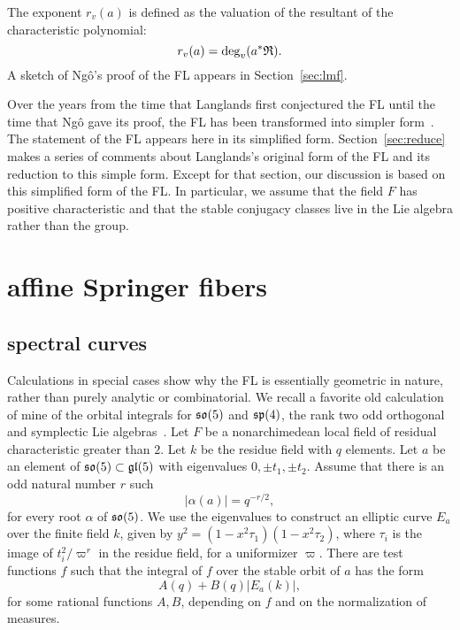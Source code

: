 \documentclass[brochure,english,12pt]{bourbaki}
\def\so{\frak{so}}
\def\sp{\frak{sp}}
\def\gl{\frak{gl}}
\def\RDIV{{\frak{R}}}
\begin{document}
The  exponent $r_v(a)$ is defined as the valuation of the resultant of the characteristic polynomial:
\[
r_v(a) = \deg_v(a^*\RDIV).
\]
A sketch of Ng\^o's proof of the FL  appears in Section~\ref{sec:lmf}. 


Over the years from the time that Langlands first conjectured the FL
until the time that Ng\^o gave its proof, the FL has been transformed
into simpler form~\cite{Langlands:debuts}.  The statement of the FL appears here in its
simplified form.  Section~\ref{sec:reduce} makes a series of comments
about Langlands's original form of the FL and its reduction
to this simple form.  Except for that section, our discussion is based
on this simplified form of the FL.  In particular, we assume that the
field $F$ has positive characteristic and that the stable conjugacy
classes live in the Lie algebra rather than the group.


\section{affine Springer fibers}

\subsection{spectral curves}

Calculations in special cases show why the FL is
essentially geometric in nature, rather than purely analytic or
combinatorial. We recall a favorite old calculation of mine of the
orbital integrals for $\so(5)$ and $\sp(4)$, the rank two odd
orthogonal and symplectic Lie algebras~\cite{hyperelliptic-curves}.  
Let $F$ be a nonarchimedean
local field of residual characteristic greater than $2$.  Let $k$ be
the residue field with $q$ elements.  Let $a$ be an element of
$\so(5)\subset \gl(5)$ with eigenvalues $0,\pm t_1,\pm t_2$.  Assume
that there is an odd natural number $r$ such
\[
|\alpha(a)| = q^{-r/2},
\]
for every root $\alpha$ of $\so(5)$. 
We use the eigenvalues to construct an elliptic curve $E_a$ over the finite field $k$, given by
$y^2 = (1-x^2\tau_1)(1-x^2\tau_2)$, where $\tau_i$ is the image
of $t_i^2/\varpi^r$ in the residue field, for a uniformizer $\varpi$.  
There are test functions $f$ 
such that the integral of $f$ over the stable orbit
of $a$ has the form
\begin{equation}\label{eqn:elliptic}
A(q) + B(q) | E_a(k)|,
\end{equation}
for some rational functions $A,B$, depending on $f$ and on the normalization of measures.
\end{document}
